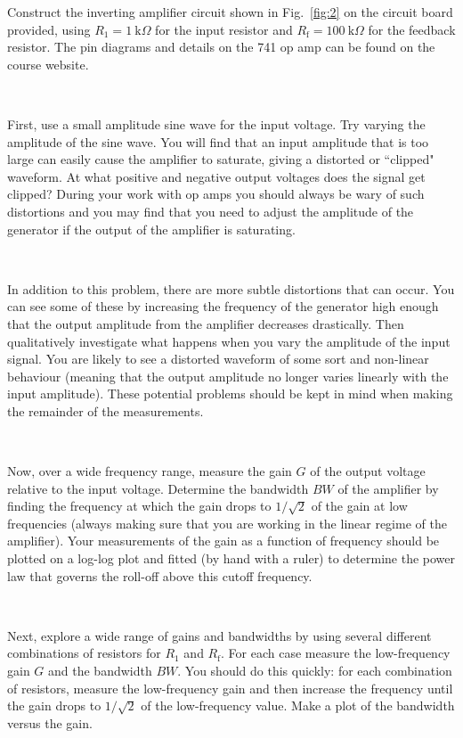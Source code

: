 \documentclass[12pt,oneside,openany,letterpaper]{article}
\begin{document}
\noindent Construct the inverting amplifier circuit shown in Fig.~\ref{fig:2} on the circuit board provided, using $R_1=1~\mathrm{k}\Omega$ for the input resistor and $R_\mathrm{f} = 100~\mathrm{k}\Omega$ for the feedback resistor. The pin diagrams and details on the 741 op amp can be found on the course website.  

~

\noindent First, use a small amplitude sine wave for the input voltage. Try varying the amplitude of the sine wave. You will find that an input amplitude that is too large can easily cause the amplifier to saturate, giving a distorted or ``clipped" waveform.  At what positive and negative output voltages does the signal get clipped? During your work with op amps you should always be wary of such distortions and you may find that you need to adjust the amplitude of the generator if the output of the amplifier is saturating.

~

\noindent In addition to this problem, there are more subtle distortions that can occur. You can see some of these by increasing the frequency of the generator high enough that the output amplitude from the amplifier decreases drastically. Then qualitatively investigate what happens when you vary the amplitude of the input signal. You are likely to see a distorted waveform of some sort and non-linear behaviour (meaning that the output amplitude no longer varies linearly with the input amplitude). These potential problems should be kept in mind when making the remainder of the measurements.

~

\noindent Now, over a wide frequency range, measure the gain $G$ of the output voltage relative to the input voltage. Determine the bandwidth $BW$ of the amplifier by finding the frequency at which the gain drops to $1/\sqrt{2}$ of the gain at low frequencies (always making sure that you are working in the linear regime of the amplifier). Your measurements of the gain as a function of frequency should be plotted on a log-log plot and fitted (by hand with a ruler) to determine the power law that governs the roll-off above this cutoff frequency.

~

\noindent Next, explore a wide range of gains and bandwidths by using several different combinations of resistors for $R_1$ and $R_\mathrm{f}$. For each case measure the low-frequency gain $G$ and the bandwidth $BW$. You should do this quickly: for each combination of resistors, measure the low-frequency gain and then increase the frequency until the gain drops to $1/\sqrt{2}$ of the low-frequency value. Make a plot of the bandwidth versus the gain.
\end{document}
